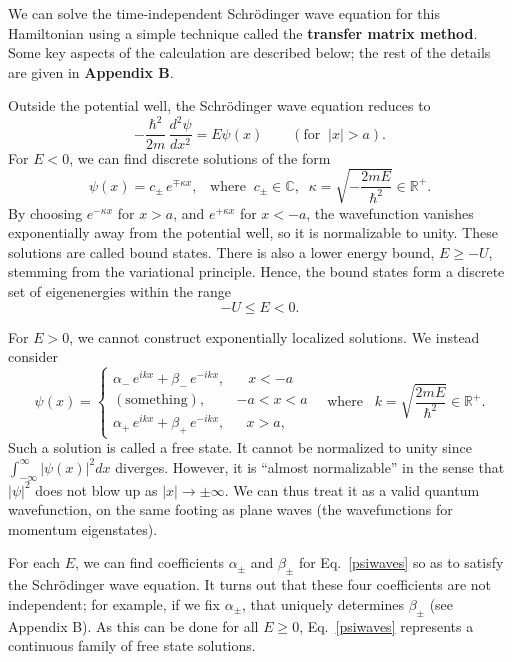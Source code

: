 \documentclass[prx,12pt]{revtex4-2}
\begin{document}
We can solve the time-independent Schr\"odinger wave equation for this
Hamiltonian using a simple technique called the \textbf{transfer
  matrix method}.  Some key aspects of the calculation are described
below; the rest of the details are given in \textbf{Appendix B}.

Outside the potential well, the Schr\"odinger wave equation reduces to
\begin{equation}
  -\frac{\hbar^2}{2m}\,\frac{d^2\psi}{dx^2} = E \psi(x)
  \qquad (\text{for}\;\;|x| > a).  
  \label{eq:psioutside}
\end{equation}
For $E < 0$, we can find discrete solutions of the form
\begin{equation}
  \psi(x) = c_\pm\, e^{\mp\kappa x},\;\;\;\mathrm{where}\;\;
  c_\pm \in \mathbb{C}, \;\;
  \kappa = \sqrt{-\frac{2mE}{\hbar^2}} \in \mathbb{R}^+.
\end{equation}
By choosing $e^{-\kappa x}$ for $x > a$, and $e^{+\kappa x}$ for $x <
-a$, the wavefunction vanishes exponentially away from the potential
well, so it is normalizable to unity.  These solutions are called
bound states.  There is also a lower energy bound, $E \ge -U$,
stemming from the variational principle.  Hence, the bound states form
a discrete set of eigenenergies within the range
\begin{equation}
  -U \le E < 0.
\end{equation}

For $E > 0$, we cannot construct exponentially localized solutions.
We instead consider
\begin{equation}
  \psi(x) = \begin{cases} \alpha_-\, e^{ik x} + \beta_-\, e^{-ik x}, & \;\;\;x < -a\\ (\mathrm{something}) , & -a < x < a\\ \alpha_+\, e^{ik x} + \beta_+\, e^{-ik x} , & \;\;\,x > a,\end{cases}
  \quad\mathrm{where}\;\;\;
  k = \sqrt{\frac{2mE}{\hbar^2}} \in \mathbb{R}^+.
  \label{psiwaves}
\end{equation}
Such a solution is called a free state.  It cannot be normalized to
unity since $\int_{-\infty}^\infty |\psi(x)|^2 dx$ diverges.  However,
it is ``almost normalizable'' in the sense that $|\psi|^2$ does not
blow up as $|x| \rightarrow \pm\infty$.  We can thus treat it as a
valid quantum wavefunction, on the same footing as plane waves (the
wavefunctions for momentum eigenstates).

For each $E$, we can find coefficients $\alpha_\pm$ and $\beta_\pm$
for Eq.~\eqref{psiwaves} so as to satisfy the Schr\"odinger wave
equation.  It turns out that these four coefficients are not
independent; for example, if we fix $\alpha_\pm$, that uniquely
determines $\beta_\pm$ (see Appendix B).  As this can be done for all
$E \ge 0$, Eq.~\eqref{psiwaves} represents a continuous family of free
state solutions.
\end{document}
